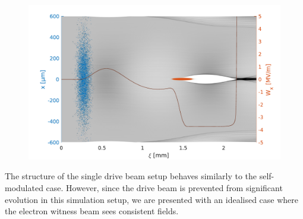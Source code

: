 \documentclass[aps,prstab,reprint,amsmath,amssymb,groupedaddress]{revtex4-1}
\begin{document}
\begin{figure}[hbt]
    \includegraphics[width=0.99\linewidth,trim={4mm 0mm 4mm 0mm},clip]{figures/plasmaDenTWake}
    \label{Fig:PlasmaDenTWake}
    \caption{}
\end{figure}



The structure of the single drive beam setup behaves similarly to the self-modulated case. However, since the drive
beam is prevented from significant evolution in this simulation setup, we are presented with an idealised case where
the electron witness beam sees consistent fields.








\end{document}
